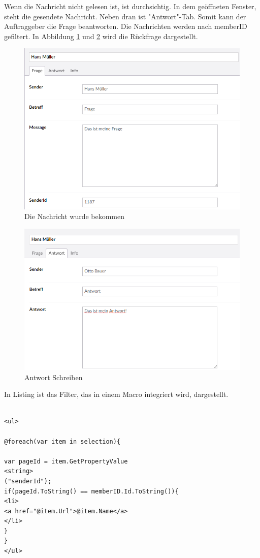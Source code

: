 Wenn die Nachricht nicht gelesen ist, ist durchsichtig. In dem geöffneten Fenster, steht die gesendete Nachricht. Neben dran ist "Antwort"-Tab. Somit kann der Auftraggeber die Frage beantworten. Die Nachrichten werden nach memberID gefiltert. In Abbildung \ref{fig:Message} und \ref{fig:antwort} wird die Rückfrage dargestellt.

\begin{figure}[h]
	\centering
	\includegraphics[width=0.7\linewidth]{Graphics/Message.png}
	\caption[Nachricht]{Die Nachricht wurde bekommen}
	\label{fig:Message}
\end{figure}

\begin{figure}[h]
	\centering
	\includegraphics[width=0.7\linewidth]{Graphics/antwortMassege.png}
	\caption[Nachricht]{Antwort Schreiben}
	\label{fig:antwort}
\end{figure}

\pagebreak

In Listing ist das Filter, das in einem Macro integriert wird, dargestellt.

\begin{lstlisting}[caption={NachrichFilter}, label=lst:NachrichFilter]

<ul>

@foreach(var item in selection){

var pageId = item.GetPropertyValue
<string>
("senderId");
if(pageId.ToString() == memberID.Id.ToString()){
<li>
<a href="@item.Url">@item.Name</a>
</li>
}
}
</ul>
\end{lstlisting}

